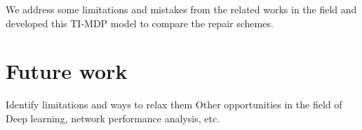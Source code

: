 \documentclass[runningheads]{llncs}
\begin{document}
We address some limitations and mistakes from the related works in the field and developed this TI-MDP model to compare the repair schemes.

\section{Future work}
Identify limitations and ways to relax them
Other opportunities in the field of Deep learning, network performance analysis, etc. 



\end{document}
